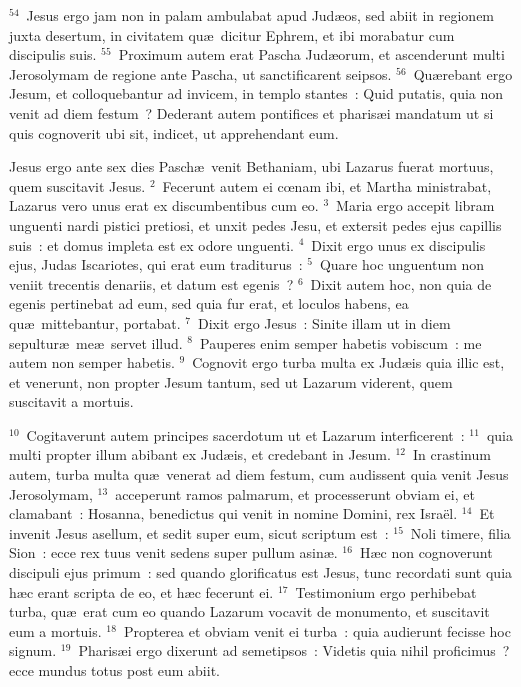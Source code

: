 ${}^{54}$~Jesus ergo jam non in palam ambulabat apud Jud\ae os, sed abiit in regionem juxta desertum, in civitatem qu\ae\ dicitur Ephrem, et ibi morabatur cum discipulis suis.
${}^{55}$~Proximum autem erat Pascha Jud\ae orum, et ascenderunt multi Jerosolymam de regione ante Pascha, ut sanctificarent seipsos.
${}^{56}$~Qu\ae rebant ergo Jesum, et colloquebantur ad invicem, in templo stantes~: Quid putatis, quia non venit ad diem festum~? Dederant autem pontifices et pharis\ae i mandatum ut si quis cognoverit ubi sit, indicet, ut apprehendant eum.

\lettrine[lines=3,image=true,loversize=0.05,lraise=-0.03]{J}{}esus ergo ante sex dies Pasch\ae\ venit Bethaniam, ubi Lazarus fuerat mortuus, quem suscitavit Jesus.
${}^{2}$~Fecerunt autem ei cœnam ibi, et Martha ministrabat, Lazarus vero unus erat ex discumbentibus cum eo.
${}^{3}$~Maria ergo accepit libram unguenti nardi pistici pretiosi, et unxit pedes Jesu, et extersit pedes ejus capillis suis~: et domus impleta est ex odore unguenti.
${}^{4}$~Dixit ergo unus ex discipulis ejus, Judas Iscariotes, qui erat eum traditurus~:
${}^{5}$~Quare hoc unguentum non veniit trecentis denariis, et datum est egenis~?
${}^{6}$~Dixit autem hoc, non quia de egenis pertinebat ad eum, sed quia fur erat, et loculos habens, ea qu\ae\ mittebantur, portabat.
${}^{7}$~Dixit ergo Jesus~: Sinite illam ut in diem sepultur\ae\ me\ae\ servet illud.
${}^{8}$~Pauperes enim semper habetis vobiscum~: me autem non semper habetis.
${}^{9}$~Cognovit ergo turba multa ex Jud\ae is quia illic est, et venerunt, non propter Jesum tantum, sed ut Lazarum viderent, quem suscitavit a mortuis.


${}^{10}$~Cogitaverunt autem principes sacerdotum ut et Lazarum interficerent~:
${}^{11}$~quia multi propter illum abibant ex Jud\ae is, et credebant in Jesum.
${}^{12}$~In crastinum autem, turba multa qu\ae\ venerat ad diem festum, cum audissent quia venit Jesus Jerosolymam,
${}^{13}$~acceperunt ramos palmarum, et processerunt obviam ei, et clamabant~: Hosanna, benedictus qui venit in nomine Domini, rex Isra\"el.
${}^{14}$~Et invenit Jesus asellum, et sedit super eum, sicut scriptum est~:
${}^{15}$~Noli timere, filia Sion~: ecce rex tuus venit sedens super pullum asin\ae .
${}^{16}$~H\ae c non cognoverunt discipuli ejus primum~: sed quando glorificatus est Jesus, tunc recordati sunt quia h\ae c erant scripta de eo, et h\ae c fecerunt ei.
${}^{17}$~Testimonium ergo perhibebat turba, qu\ae\ erat cum eo quando Lazarum vocavit de monumento, et suscitavit eum a mortuis.
${}^{18}$~Propterea et obviam venit ei turba~: quia audierunt fecisse hoc signum.
${}^{19}$~Pharis\ae i ergo dixerunt ad semetipsos~: Videtis quia nihil proficimus~? ecce mundus totus post eum abiit.


